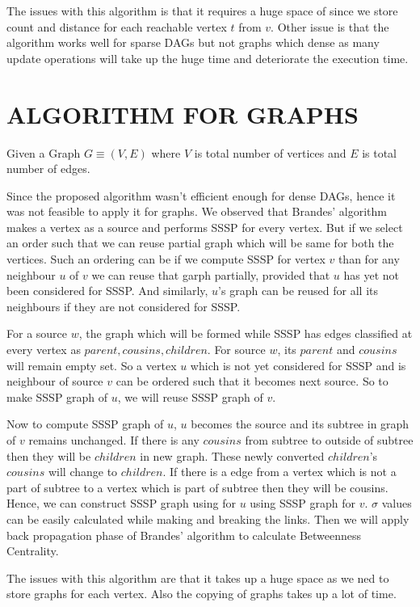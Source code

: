 \documentclass[MTech]{iitmdiss}
\begin{document}
The issues with this algorithm is that it requires a huge space of since we store count and distance for each reachable vertex $t$ from $v$. Other issue is that the algorithm works well for sparse DAGs but not graphs which dense as many update operations will take up the huge time and deteriorate the execution time.


\chapter{ALGORITHM FOR GRAPHS}

Given a Graph $G \equiv (V,E)$ where $V$ is total number of vertices and $E$ is total number of edges.

Since the proposed algorithm wasn't efficient enough for dense DAGs, hence it was not feasible to apply it for graphs. 
We observed that Brandes' algorithm makes a vertex as a source and performs SSSP for every vertex. But if we select an order such that we can reuse partial graph which will be same for both the vertices. Such an ordering can be if we compute SSSP for vertex $v$ than for any neighbour $u$ of $v$ we can reuse that garph partially, provided that $u$ has yet not been considered for SSSP. And similarly, $u$'s graph can be reused for all its neighbours if they are not considered for SSSP.

For a source $w$, the graph which will be formed while SSSP has edges classified at every vertex as $parent, cousins, children$.
For source $w$, its $parent$ and $cousins$ will remain empty set.
So a vertex $u$ which is not yet considered for SSSP and is neighbour of source $v$ can be ordered such that it becomes next source. So to make SSSP graph of $u$, we will reuse SSSP graph of $v$.

Now to compute SSSP graph of $u$, $u$ becomes the source and its subtree in graph of $v$ remains unchanged. If there is any $cousins$ from subtree to outside of subtree then they will be $children$ in new graph. These newly converted $children$'s $cousins$ will change to $children$.
If there is a edge from a vertex which is not a part of subtree  to a vertex which is part of subtree then they will be cousins.
Hence, we can construct SSSP graph using for $u$ using SSSP graph for $v$.
$\sigma$ values can be easily calculated while making and breaking the links. Then we will apply back propagation phase of Brandes' algorithm to calculate Betweenness Centrality. 

The issues with this algorithm are that it takes up a huge space as we ned to store graphs for each vertex. Also the copying of graphs takes up a lot of time. 
\end{document}
